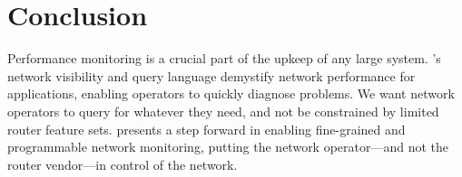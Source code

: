 \section{Conclusion}
\label{sec:conclusion}

Performance monitoring is a crucial part of the upkeep of any large system.
\TheSystem's network visibility and query language demystify network
performance for applications, enabling operators to quickly diagnose
problems.  We want network operators to query for whatever they need, and not
be constrained by limited router feature sets. \TheSystem presents a step
forward in enabling fine-grained and programmable network monitoring, putting
the network operator---and not the router vendor---in control of the network.
